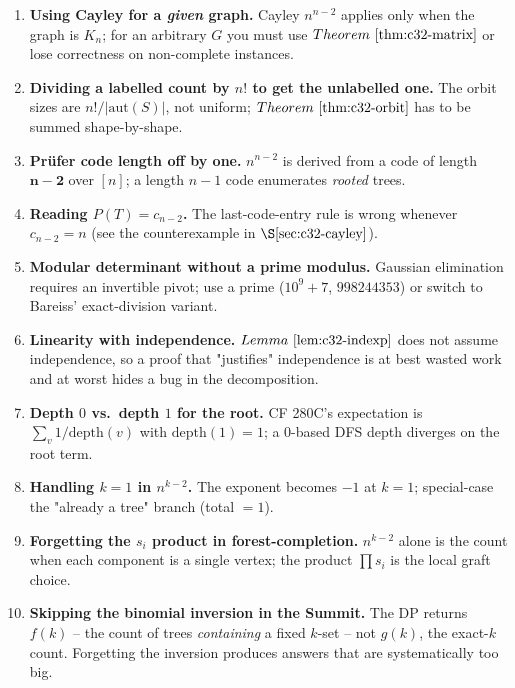 \begin{enumerate}[nosep]
  \item \textbf{Using Cayley for a \emph{given} graph.}  Cayley \(n^{n-2}\)
        applies only when the graph is \(K_n\); for an arbitrary \(G\) you
        must use \(\thmref{c32-matrix}\) or lose correctness on non-complete
        instances.
  \item \textbf{Dividing a labelled count by \(n!\) to get the unlabelled
        one.}  The orbit sizes are \(n!/|\mathrm{aut}(S)|\), not uniform;
        \(\thmref{c32-orbit}\) has to be summed shape-by-shape.
  \item \textbf{Pr\"ufer code length off by one.}  \(n^{n-2}\) is derived
        from a code of length \(\boldsymbol{n-2}\) over \([n]\); a length
        \(n-1\) code enumerates \emph{rooted} trees.
  \item \textbf{Reading \(P(T)=c_{n-2}\).}  The last-code-entry rule is
        wrong whenever \(c_{n-2}=n\) (see the counterexample in
        \(\secref{c32-cayley}\)).
  \item \textbf{Modular determinant without a prime modulus.}  Gaussian
        elimination requires an invertible pivot; use a prime (\(10^9+7\),
        \(998244353\)) or switch to Bareiss' exact-division variant.
  \item \textbf{Linearity with independence.}  \(\lemref{c32-indexp}\)
        does not assume independence, so a proof that "justifies"
        independence is at best wasted work and at worst hides a bug in
        the decomposition.
  \item \textbf{Depth \(0\) vs.\ depth \(1\) for the root.}  CF 280C's
        expectation is \(\sum_v 1/\mathrm{depth}(v)\) with
        \(\mathrm{depth}(1)=1\); a \(0\)-based DFS depth diverges on the
        root term.
  \item \textbf{Handling \(k=1\) in \(n^{k-2}\).}  The exponent
        becomes \(-1\) at \(k=1\); special-case the "already a tree"
        branch (total \(=1\)).
  \item \textbf{Forgetting the \(s_i\) product in forest-completion.}
        \(n^{k-2}\) alone is the count when each component is a single
        vertex; the product \(\prod s_i\) is the local graft choice.
  \item \textbf{Skipping the binomial inversion in the Summit.}  The DP
        returns \(f(k)\) -- the count of trees \emph{containing} a fixed
        \(k\)-set -- not \(g(k)\), the exact-\(k\) count.  Forgetting the
        inversion produces answers that are systematically too big.
\end{enumerate}

